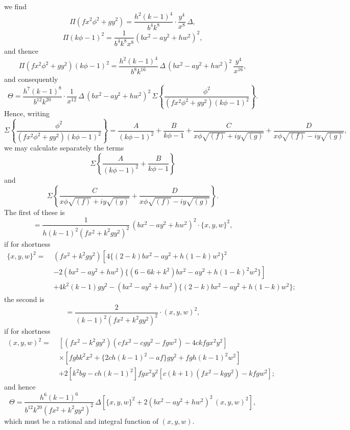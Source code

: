 \documentclass[11pt,a4paper]{article}
\begin{document}
we find
\[
\Pi(fx^{2}\phi^{2} + gy^{2}) = \frac{h^{2}(k - 1)^{4}}{b^{4}k^{8}} \cdot \frac{y^{4}}{x^{8}}\, \Delta,
\]
\[
\Pi(k\phi - 1)^{2} = \frac{1}{b^{4}k^{8}x^{8}}(bx^{2} - ay^{2} + hw^{2})^{2},
\]
and thence
\[
\Pi(fx^{2}\phi^{2} + gy^{2})(k\phi - 1)^{2} = \frac{h^{2}(k - 1)^{4}}{b^{8}k^{16}}\, \Delta\,(bx^{2} - ay^{2} + hw^{2})^{2}\, \frac{y^{4}}{x^{16}},
\]
and consequently
\[
\Theta = \frac{h^{7}(k - 1)^{8}}{b^{12}k^{20}} \cdot \frac{1}{x^{12}}\, \Delta\,(bx^{2} - ay^{2} + hw^{2})^{2}\, \Sigma\!\left\{ \frac{\phi^{2}}{(fx^{2}\phi^{2} + gy^{2})(k\phi - 1)^{2}} \right\}.
\]
Hence, writing
\[
\Sigma\!\left\{ \frac{\phi^{2}}{(fx^{2}\phi^{2} + gy^{2})(k\phi - 1)^{2}} \right\} = \frac{A}{(k\phi - 1)^{2}} + \frac{B}{k\phi - 1} + \frac{C}{x\phi\sqrt{(f)} + iy\sqrt{(g)}} + \frac{D}{x\phi\sqrt{(f)} - iy\sqrt{(g)}},
\]
we may calculate separately the terms
\[
\Sigma\!\left\{ \frac{A}{(k\phi - 1)^{2}} + \frac{B}{k\phi - 1} \right\}
\]
and
\[
\Sigma\!\left\{ \frac{C}{x\phi\sqrt{(f)} + iy\sqrt{(g)}} + \frac{D}{x\phi\sqrt{(f)} - iy\sqrt{(g)}} \right\}.
\]
The first of these is
\[
= \frac{1}{h(k - 1)^{2}(fx^{2} + k^{2}gy^{2})^{2}}\,(bx^{2} - ay^{2} + hw^{2})^{2} \cdot \{x, y, w\}^{2},
\]
if for shortness
\[
\begin{aligned}
\{x, y, w\}^{2} =\;& (fx^{2} + k^{2}gy^{2})\!\left[4\{(2 - k)bx^{2} - ay^{2} + h(1 - k)w^{2}\}^{2} \right. \\
& \left. -2(bx^{2} - ay^{2} + hw^{2})\{(6 - 6k + k^{2})bx^{2} - ay^{2} + h(1 - k)^{2} w^{2}\}\right] \\
& + 4k^{2}(k - 1)gy^{2} - (bx^{2} - ay^{2} + hw^{2})\{(2 - k)bx^{2} - ay^{2} + h(1 - k)w^{2}\};
\end{aligned}
\]
the second is
\[
= \frac{2}{(k - 1)^{2}(fx^{2} + k^{2}gy^{2})^{2}} \cdot (x, y, w)^{2},
\]
if for shortness
\[
\begin{aligned}
(x, y, w)^{2} =\;& \left[(fx^{2} - k^{2}gy^{2})(cfx^{2} - cgy^{2} - fgw^{2}) - 4ckfgx^{2}y^{2}\right] \\
& \times \left[fgbk^{2}x^{2} + \{2ch(k - 1)^{2} - af\}gy^{2} + fgh(k - 1)^{2} w^{2}\right] \\
& + 2\!\left[k^{2}bg - ch(k - 1)^{2}\right]fgx^{2}y^{2}\!\left[c(k + 1)(fx^{2} - kgy^{2}) - kfgw^{2}\right];
\end{aligned}
\]
and hence
\[
\Theta = \frac{h^{6}(k - 1)^{6}}{b^{12}k^{20}(fx^{2} + k^{2}gy^{2})^{2}}\, \Delta\!\left[\{x, y, w\}^{2} + 2(bx^{2} - ay^{2} + hw^{2})^{2}\,(x, y, w)^{2}\right],
\]
which must be a rational and integral function of $(x, y, w)$.
\end{document}
